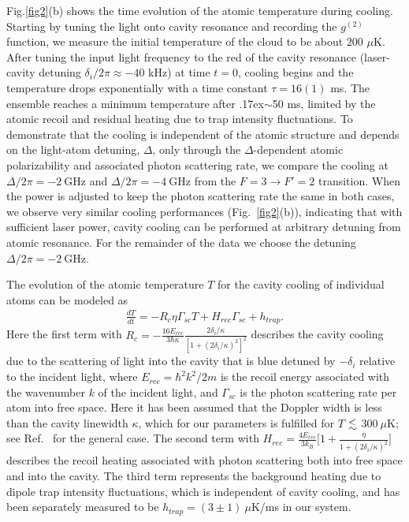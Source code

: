 \documentclass[aps,prl,superscriptaddress,onecloumn,nobibnotes]{revtex4-1}
\begin{document}
 

Fig.\ref{fig2}(b) shows the time evolution of the atomic temperature during cooling. Starting by tuning the light onto cavity resonance and recording the $g^{(2)}$ function, we measure the initial temperature of the cloud to be about 200 $\mu$K. After tuning the input light frequency
 to the red of the cavity resonance (laser-cavity detuning $\delta_i/2\pi\approx -40$ kHz) at time $t=0$, cooling begins and the temperature drops exponentially with a time constant $\tau=16(1)$ ms. The ensemble reaches a minimum temperature after {\raise.17ex\hbox{$\scriptstyle\mathtt{\sim}$}}50 ms, limited by the atomic recoil and residual heating due to trap intensity fluctuations. To demonstrate that the cooling is independent of the atomic structure and depends on the light-atom detuning, $\Delta$, only through the $\Delta$-dependent atomic polarizability and associated photon scattering rate, we compare the cooling at $\Delta/2\pi=-2~\mathrm{GHz}$ and $\Delta/2\pi=-4~\mathrm{GHz}$ from the $ F=3\to F'=2$ transition. When the power is adjusted to keep the photon scattering rate the same in both cases, we observe very similar cooling performances (Fig.~\ref{fig2}(b)), indicating that with sufficient laser power, cavity cooling can be performed at arbitrary detuning from atomic resonance. For the remainder of the data we choose the detuning $\Delta/2\pi=-2~\mathrm{GHz}$.\par
  



The evolution of the atomic temperature $T$ for the cavity cooling of individual atoms can be modeled as~\cite{VV:pra2001}
\begin{eqnarray}
\frac{dT}{dt}= -R_c \eta \Gamma_{sc} T+H_{rec}\Gamma_{sc}+h_{trap}.
\label{eq:Tvst}
\end{eqnarray}
Here the first term with $R_c=-\frac{16E_{rec}}{3\hbar \kappa}\frac{2\delta_i/\kappa}{[1+(2\delta_i/\kappa)^2]^2} $ describes the cavity cooling due to the scattering of light into the cavity that is blue detuned by $-\delta_i$ relative to the incident light, where $E_{rec}=\hbar^2k^2/2m$ is the recoil energy associated with the wavenumber $k$ of the incident light, and $\Gamma_{sc}$ is the photon scattering rate per atom into free space. Here it has been assumed that the Doppler width is less than the cavity linewidth $\kappa$, which for our parameters is fulfilled for $T$ ${\footnotesize \lesssim}$ $300 ~\mu$K; see Ref.~\cite{VV:pra2001} for the general case. The second term with $H_{rec}=\frac{4 E_{rec}}{3 k_B} \big[ 1+\frac{\eta}{1+(2\delta_i/\kappa)^2}\big]$ describes the recoil heating associated with photon scattering both into free space and into the cavity. The third term represents the background heating due to dipole trap intensity fluctuations, which is independent of cavity cooling, and has been separately measured to be $h_{trap}=(3\pm 1)~\mu$K/ms in our system. 
\end{document}
